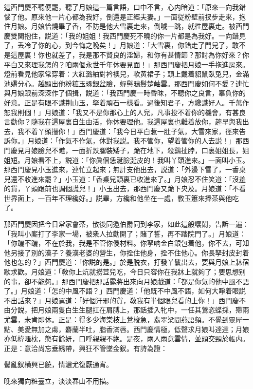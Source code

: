 這西門慶不聽便罷，聽了月娘這一篇言語，口中不言，心内暗道：「原來一向我錯惱了他。原來他一片心都為我好，倒還是正經夫妻。」一面従粉壁前扠步走來，抱住月娘。月娘恰燒畢了香，不防是他大雪裏走來，倒唬一跳，就徃屋裏走。被西門慶雙関抱住，説道：「我的姐姐！我西門慶死不曉的你一片都是為我好。一向錯見了，丢冷了你的心，到今悔之晚矣！」月娘道：「大雪裏，你錯走了門兒了，敢不是這屋裏！你也就差了，我是那不賢良的淫婦，和你有甚情節？那討為你好來？你平白又來理我怎的？咱兩個永世千年休要見面！」那西門慶把月娘一手拖進房來。燈前看見他家常穿着：大紅潞紬對衿襖兒，軟黄裙子；頭上戴着貂鼠臥兔兒，金滿池嬌分心。越顯出他粉粧玉琢銀盆臉，蟬髻鴉鬟楚岫雲。那西門慶如何不愛？連忙與月娘跟前深深作了個揖，説道：「我西門慶一時昏昧，不聽你之良言，辜負你的好意。正是有眼不識荆山玉，拏着頑石一樣看。過後知君子，方纔識好人。千萬作恕我則個！」月娘道：「我又不是你那心上的人兒，凡事投不着你的機會，有甚良言勸你？隨我在這屋裏自生由活，你休要理他。我這屋裏也難着放你，趂早與我出去，我不着丫頭攆你！」西門慶道：「我今日平白惹一肚子氣，大雪來家，徑來告訴你。」月娘道：「作氣不作氣，休對我説。我不管你，望着管你的人去説！」那西門慶見月娘臉兒不瞧，一面折跌腿裝矮子，跪在地下，殺鷄扯脖，口裏姐姐長，姐姐短。月娘看不上，説道：「你眞個恁涎臉涎皮的！我叫丫頭進來。」一面叫小玉。那西門慶見小玉進來，連忙立起來；無計支他出去，説道：「外邊下雪了，一香桌兒還不收進來罷？」小玉道：「香桌兒頭裏已收進來了。」月娘忍不住笑道：「沒羞的貨，丫頭跟前也調個謊兒！」小玉出去，那西門慶又跪下央及。月娘道：「不看世界面上，一百年不理纔好。」説畢，方纔和他坐在一處，敎玉簫來捧茶與他吃了。

那西門慶因把今日常家會茶，散後同邀伯爵同到李家，如此這般嚷鬧，告訴一遍：「我叫小廝打了李家一場，被衆人拉勸開了；賭了誓，再不踏院門了。」月娘道：「你躧不躧，不在於我，我是不管你儍材料。你拏响金白銀包着他，你不去，可知他另接了別的漢子？養漢老婆的營生，你拴住他身，拴不住他心。你長拏封皮封着他也怎的？」西門慶道：「你説的是。」於是脱衣，打發丫鬟出去，要與月娘上牀宿歇求歡。月娘道：「敎你上炕就撈荳兒吃，今日只容你在我牀上就夠了；要思想别的事，卻不能夠。」那西門慶把那話露將出來向月娘戲道：「都是你氣的他中風不語了。」月娘道：「怎的中風不語？」西門慶道：「他既不中風不語，如何大睜着眼説不出話來？」月娘駡道：「好個汗邪的貨，敎我有半個眼兒看的上你！」西門慶不由分説，把月娘兩隻白生生腿扛在肩膊上，那話插入牝中，一任其鶯恣蝶採，殢雨尤雲，未肯即休。正是：得多少海棠枝上鶯梭急，翡翠梁間燕語頻。不覺到靈犀一點、美愛無加之䖏，麝蘭半吐，脂香滿唇。西門慶情極，低聲求月娘叫達達；月娘亦低幃暱枕，態有餘妍，口呼親親不絶。是夜，兩人雨意雲情，並頭交頸於帳内。正是：意洽尚忘垂綉帶，興狂不管墜金釵。有詩為證：

\begin{myquote}
鬢亂釵横興已饒，情濃尤復厭通宵。

晚來獨向粧臺立，淡淡春山不用描。
\end{myquote}

